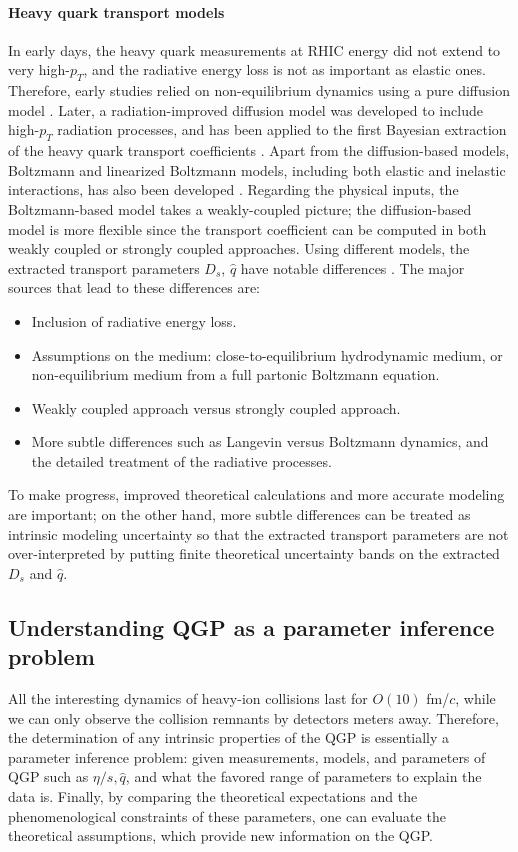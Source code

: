 \paragraph{Heavy quark transport models}
In early days, the heavy quark measurements at RHIC energy did not extend to very high-$p_T$, and the radiative energy loss is not as important as elastic ones.
Therefore, early studies relied on non-equilibrium dynamics using a pure diffusion model \cite{Moore:2004tg,vanHees:2007me}. 
Later, a radiation-improved diffusion model was developed \cite{Cao:2013ita} to include high-$p_T$ radiation processes, and has been applied to the first Bayesian extraction of the heavy quark transport coefficients \cite{Xu:2017obm}.
Apart from the diffusion-based models, Boltzmann and linearized Boltzmann models, including both elastic and inelastic interactions, has also been developed \cite{Scardina:2017ipo,Cao:2017hhk,Ke:2018tsh}.
Regarding the physical inputs, the Boltzmann-based model takes a weakly-coupled picture; the diffusion-based model is more flexible since the transport coefficient can be computed in both weakly coupled or strongly coupled approaches.
Using different models, the extracted transport parameters $D_s$, $\hat{q}$ have notable differences \cite{Rapp:2018qla,PhysRevC.99.014902,Cao:2018ews}.
The major sources that lead to these differences are:
\begin{itemize}
\item Inclusion of radiative energy loss.
\item Assumptions on the medium: close-to-equilibrium hydrodynamic medium, or non-equilibrium medium from a full partonic Boltzmann equation.
\item Weakly coupled approach versus strongly coupled approach.
\item More subtle differences such as Langevin versus Boltzmann dynamics, and the detailed treatment of the radiative processes.
\end{itemize}
To make progress, improved theoretical calculations and more accurate modeling are important; on the other hand, more subtle differences can be treated as intrinsic modeling uncertainty so that the extracted transport parameters are not over-interpreted by putting finite theoretical uncertainty bands on the extracted $D_s$ and $\hat{q}$. 

\subsection{Understanding QGP as a parameter inference problem}
All the interesting dynamics of heavy-ion collisions last for $O(10) $ fm/$c$, while we can only observe the collision remnants by detectors meters away.
Therefore, the determination of any intrinsic properties of the QGP is essentially  a parameter inference problem:
given measurements, models, and parameters of QGP such as $\eta/s, \hat{q}$, and what the favored range of parameters to explain the data is.
Finally, by comparing the theoretical expectations and the phenomenological constraints of these parameters, one can evaluate the theoretical assumptions, which provide new information on the QGP.


